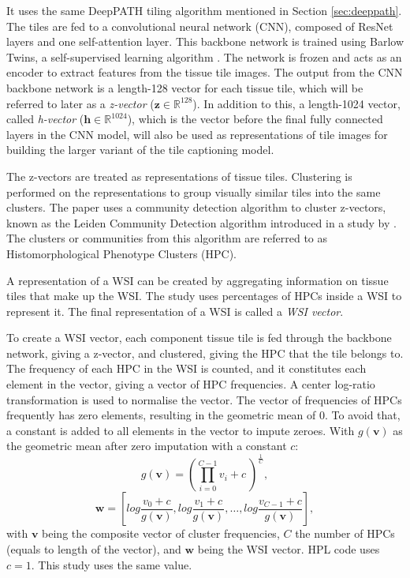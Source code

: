 \documentclass{l4proj}
\begin{document}
It uses the same DeepPATH tiling algorithm mentioned in Section \ref{sec:deeppath}. The tiles are fed to a convolutional neural network (CNN), composed of ResNet layers \citep{resnet} and one self-attention layer. This backbone network is trained using Barlow Twins, a self-supervised learning algorithm \citep{zbontar2021}. The network is frozen and acts as an encoder to extract features from the tissue tile images. The output from the CNN backbone network is a length-128 vector for each tissue tile, which will be referred to later as a \emph{z-vector} ($\boldsymbol{z} \in \mathbb{R}^{128}$). In addition to this, a length-1024 vector, called \emph{h-vector} ($\boldsymbol{h} \in \mathbb{R}^{1024}$), which is the vector before the final fully connected layers in the CNN model, will also be used as representations of tile images for building the larger variant of the tile captioning model.

The z-vectors are treated as representations of tissue tiles. Clustering is performed on the representations to group visually similar tiles into the same clusters. The paper uses a community detection algorithm to cluster z-vectors, known as the Leiden Community Detection algorithm introduced in a study by \cite{Traag2019}. The clusters or communities from this algorithm are referred to as Histomorphological Phenotype Clusters (HPC).

A representation of a WSI can be created by aggregating information on tissue tiles that make up the WSI. The study uses percentages of HPCs inside a WSI to represent it. The final representation of a WSI is called a \emph{WSI vector}.

To create a WSI vector, each component tissue tile is fed through the backbone network, giving a z-vector, and clustered, giving the HPC that the tile belongs to. The frequency of each HPC in the WSI is counted, and it constitutes each element in the vector, giving a vector of HPC frequencies. A center log-ratio transformation is used to normalise the vector. The vector of frequencies of HPCs frequently has zero elements, resulting in the geometric mean of $0$. To avoid that, a constant is added to all elements in the vector to impute zeroes. With $g(\boldsymbol{v})$ as the geometric mean after zero imputation with a constant $c$:
\begin{equation}
    g(\boldsymbol{v}) = \left( \prod_{i=0}^{C-1} v_i + c\ \right)^\frac{1}{C} ,
\end{equation}
\begin{equation}
    \boldsymbol{w} = \left[log\frac{v_0 + c}{g(\boldsymbol{v})},log\frac{v_1 + c}{g(\boldsymbol{v})},\dots,log\frac{v_{C-1} + c}{g(\boldsymbol{v})}\right],
\end{equation}
with $\boldsymbol{v}$ being the composite vector of cluster frequencies, $C$ the number of HPCs (equals to length of the vector), and $\boldsymbol{w}$ being the WSI vector. HPL code uses $c = 1$. This study uses the same value.
\end{document}
